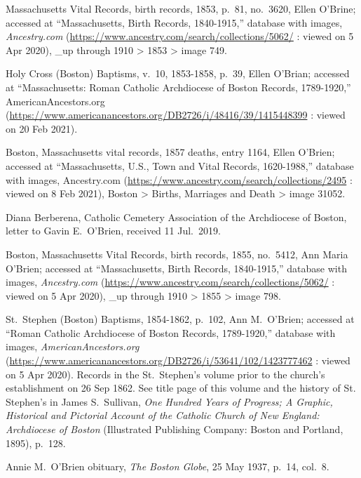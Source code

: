 \begin{thebibliography}{999}
Massachusetts Vital Records, birth records, 1853, p.\ 81, no.\ 3620, Ellen O'Brine; accessed at ``Massachusetts, Birth Records, 1840-1915,'' database with images, \textit{Ancestry.com} (\url{https://www.ancestry.com/search/collections/5062/} : viewed on 5 Apr 2020), \_up through 1910 > 1853 > image 749.

Holy Cross (Boston) Baptisms, v.\ 10, 1853-1858, p.\ 39, Ellen O'Brian; accessed at ``Massachusetts: Roman Catholic Archdiocese of Boston Records, 1789-1920,'' AmericanAncestors.org (\url{https://www.americanancestors.org/DB2726/i/48416/39/1415448399} : viewed on 20 Feb 2021).

Boston, Massachusetts vital records, 1857 deaths, entry 1164, Ellen O'Brien; accessed at ``Massachusetts, U.S., Town and Vital Records, 1620-1988,'' database with images, Ancestry.com (\url{https://www.ancestry.com/search/collections/2495} : viewed on 8 Feb 2021), Boston > Births, Marriages and Death > image 31052.

Diana Berberena, Catholic Cemetery Association of the Archdiocese of Boston, letter to Gavin E.\ O'Brien, received 11 Jul.\ 2019.

Boston, Massachusetts Vital Records, birth records, 1855, no.\ 5412, Ann Maria O'Brien; accessed at ``Massachusetts, Birth Records, 1840-1915,'' database with images, \textit{Ancestry.com} (\url{https://www.ancestry.com/search/collections/5062/} : viewed on 5 Apr 2020), \_up through 1910 > 1855 > image 798.

St.\ Stephen (Boston) Baptisms, 1854-1862, p.\ 102, Ann M.\ O'Brien; accessed at ``Roman Catholic Archdiocese of Boston Records, 1789-1920,'' database with images, \textit{AmericanAncestors.org} (\url{https://www.americanancestors.org/DB2726/i/53641/102/1423777462} : viewed on 5 Apr 2020). Records in the St.\ Stephen's volume prior to the church's establishment on 26 Sep 1862. See title page of this volume and the history of St. Stephen's in James S.\ Sullivan, \textit{One Hundred Years of Progress; A Graphic, Historical and Pictorial Account of the Catholic Church of New England: Archdiocese of Boston} (Illustrated Publishing Company: Boston and Portland, 1895), p.\ 128.

Annie M.\ O'Brien obituary, \textit{The Boston Globe}, 25 May 1937, p.\ 14, col.\ 8.


\end{thebibliography}
